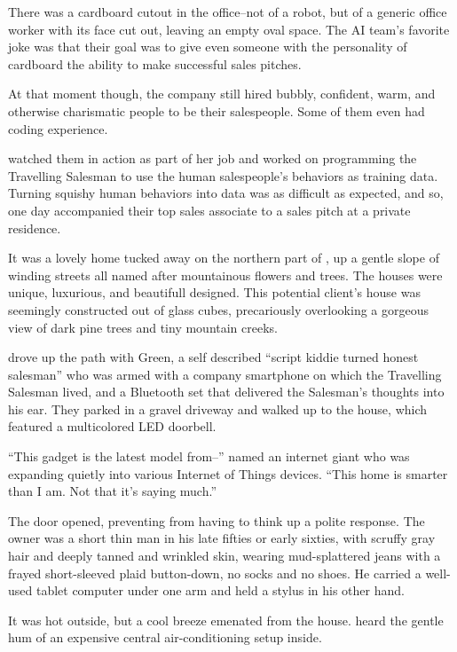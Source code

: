 There was a cardboard cutout in the office--not of a robot, but of a generic office worker with its face cut out, leaving an empty oval space. The AI team's favorite joke was that their goal was to give even someone with the personality of cardboard the ability to make successful sales pitches.

At that moment though, the company still hired bubbly, confident, warm, and otherwise charismatic people to be their salespeople. Some of them even had coding experience.

{\protag} watched them in action as part of her job and worked on programming the Travelling Salesman to use the human salespeople’s behaviors as training data. Turning squishy human behaviors into data was as difficult as expected, and so, one day {\protag} accompanied their top sales associate to a sales pitch at a private residence.

It was a lovely home tucked away on the northern part of \crunchyCity{}, up a gentle slope of winding streets all named after mountainous flowers and trees. The houses were unique, luxurious, and beautifull designed. This potential client's house was seemingly constructed out of glass cubes, precariously overlooking a gorgeous view of dark pine trees and tiny mountain creeks.

{\protag} drove up the path with \energyJerk{} Green, a self described ``script kiddie turned honest salesman'' who was armed with a company smartphone on which the Travelling Salesman lived, and a Bluetooth set that delivered the Salesman's thoughts into his ear. They parked in a gravel driveway and walked up to the house, which featured a multicolored LED doorbell.

``This gadget is the latest model from--'' \energyJerk{} named an internet giant who was expanding quietly into various Internet of Things devices. ``This home is smarter than I am. Not that it's saying much.''

The door opened, preventing {\protag} from having to think up a polite response. The owner was a short thin man in his late fifties or early sixties, with scruffy gray hair and deeply tanned and wrinkled skin, wearing mud-splattered jeans with a frayed short-sleeved plaid button-down, no socks and no shoes. He carried a well-used tablet computer under one arm and held a stylus in his other hand.

It was hot outside, but a cool breeze emenated from the house. {\protag} heard the gentle hum of an expensive central air-conditioning setup inside.

